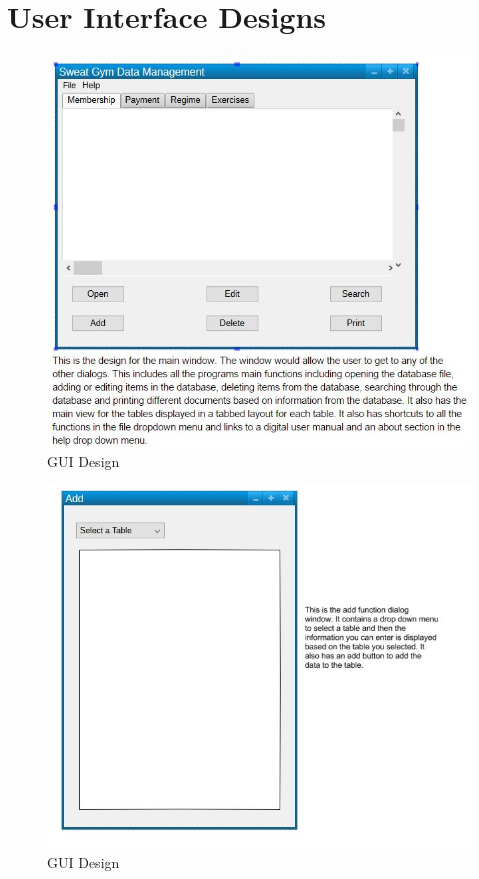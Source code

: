\section{User Interface Designs}

\begin{figure}[H]
    \includegraphics[width=\textwidth]{Gui_1.JPG}
    \caption{GUI Design} \label{fig:GUI Designs}
\end{figure}

\begin{figure}[H]
    \includegraphics[width=\textwidth]{Gui_2.JPG}
    \caption{GUI Design} \label{fig:GUI Designs}
\end{figure}

